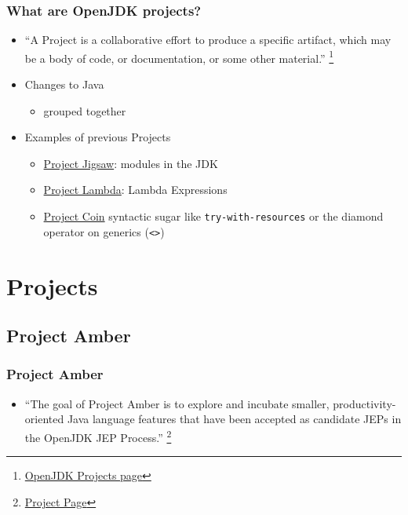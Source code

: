 \documentclass{beamer}
\begin{document}
\begin{frame}
\frametitle{What are OpenJDK projects?}
\begin{itemize}
  \item ``A Project is a collaborative effort to produce a specific artifact, which may be a body of code, or documentation, or some other material.''
  	\footnote{\href{https://openjdk.org/projects/}{OpenJDK Projects page}}
  \pause
  \item Changes to Java
  \begin{itemize}
    \item grouped together
  \end{itemize}
  \pause
  \item Examples of previous Projects
  \begin{itemize}
    \item \href{https://openjdk.org/projects/jigsaw/}{Project Jigsaw}:
    	modules in the JDK
    \item \href{https://openjdk.org/projects/lambda/}{Project Lambda}:
    	Lambda Expressions
    \item \href{https://openjdk.org/projects/coin/}{Project Coin}
    	syntactic sugar like \texttt{try-with-resources} or the diamond operator on generics (\texttt{<>})
  \end{itemize}
\end{itemize}
\end{frame}


\section{Projects}

\subsection{Project Amber}
\begin{frame}
\frametitle{Project Amber}
\begin{itemize}
  \item ``The goal of Project Amber is to explore and incubate smaller, productivity-oriented Java language features that have been accepted as candidate JEPs in the OpenJDK JEP Process.''
	\footnote{\href{https://openjdk.org/projects/amber/}{Project Page}}
\end{itemize}
\end{frame}
\end{document}
